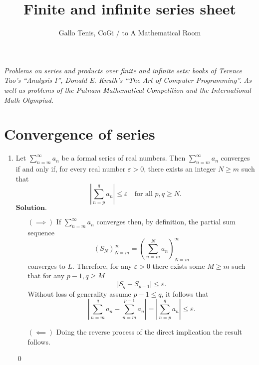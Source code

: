 \documentclass{article}
\title{Finite and infinite series sheet}
\author{Gallo Tenis, CoGi / to A Mathematical Room}
\theoremstyle{remark}
\begin{document}
\maketitle

\begin{center}
    \textit{Problems on series and products over finite and infinite sets: books of Terence Tao's ``Analysis I'', Donald E. Knuth's ``The Art of Computer Programming''.
    As well as problems of the Putnam Mathematical Competition and the International Math Olympiad.}
\end{center}
\section*{Convergence of series}
\begin{enumerate}
    \item Let \( \sum_{n=m}^{\infty} a_n \) be a formal series of real numbers. Then \( \sum_{n=m}^{\infty} a_n \) converges if and only if, for every real number \( \varepsilon > 0 \), there exists an integer \( N \geq m \) such that
    \[
    \left| \sum_{n=p}^{q} a_n \right| \leq \varepsilon \quad \text{for all } p,q \geq N.
    \]
    $\textbf{Solution.}$
    \begin{enumerate}
        \item[$(\implies)$] If $\sum_{n=m}^{\infty} a_n$ converges then, by definition, the partial sum sequence 
        \[
        (S_N)_{N=m}^{\infty} = \left(\sum_{n=m}^{N}a_n\right)_{N=m}^{\infty}
        \]
        converges to $L$.
        Therefore, for any $\varepsilon > 0$ there exists some $M \geq m$ such that for any $p-1,q \geq M$
        \[
        \vert S_q - S_{p-1} \vert \leq \varepsilon.
        \]
        Without loss of generality assume $p - 1 \leq q$, it follows that
        \[
        \left\lvert \sum_{n=m}^{q}a_n - \sum_{n=m}^{p-1}a_n \right\rvert = \left\lvert \sum_{n=p}^{q}a_n \right\rvert \leq \varepsilon.
        \]
        
        \item[$(\impliedby)$] Doing the reverse process of the direct implication the result follows.
    \end{enumerate}
    \begin{flushright}
        \qed
    \end{flushright}


\end{enumerate}
\end{document}

